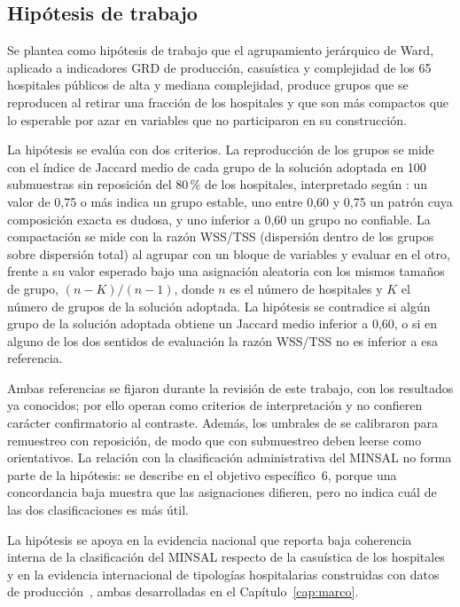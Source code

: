 \subsection{Hipótesis de trabajo}
\label{sec:hipotesis}

Se plantea como hipótesis de trabajo que el agrupamiento jerárquico de Ward,
aplicado a indicadores GRD de producción, casuística y complejidad de los 65
hospitales públicos de alta y mediana complejidad, produce grupos que se
reproducen al retirar una fracción de los hospitales y que son más compactos
que lo esperable por azar en variables que no participaron en su construcción.

La hipótesis se evalúa con dos criterios. La reproducción de los grupos se mide
con el índice de Jaccard medio de cada grupo de la solución adoptada en 100
submuestras sin reposición del 80\,\% de los hospitales, interpretado según
\citet{Hennig2007}: un valor de 0,75 o más indica un grupo estable, uno entre
0,60 y 0,75 un patrón cuya composición exacta es dudosa, y uno inferior a 0,60
un grupo no confiable. La compactación se mide con la razón WSS/TSS (dispersión
dentro de los grupos sobre dispersión total) al agrupar con un bloque de
variables y evaluar en el otro, frente a su valor esperado bajo una asignación
aleatoria con los mismos tamaños de grupo, $(n-K)/(n-1)$, donde $n$ es el
número de hospitales y $K$ el número de grupos de la solución adoptada. La
hipótesis se contradice si algún grupo de la solución adoptada obtiene un
Jaccard medio inferior a 0,60, o si en alguno de los dos sentidos de evaluación
la razón WSS/TSS no es inferior a esa referencia.

Ambas referencias se fijaron durante la revisión de este trabajo, con los
resultados ya conocidos; por ello operan como criterios de interpretación y no
confieren carácter confirmatorio al contraste. Además, los umbrales de
\citet{Hennig2007} se calibraron para remuestreo con reposición, de modo que con
submuestreo deben leerse como orientativos. La relación con la clasificación
administrativa del MINSAL no forma parte de la hipótesis: se describe en el
objetivo específico~6, porque una concordancia baja muestra que las
asignaciones difieren, pero no indica cuál de las dos clasificaciones es más
útil.

La hipótesis se apoya en la evidencia nacional que reporta baja coherencia
interna de la clasificación del MINSAL respecto de la casuística de los
hospitales~\citep{Carlier2020, Giglio2021, Villalobos2016} y en la evidencia
internacional de tipologías hospitalarias construidas con datos de
producción~\citep{Chrusciel2021, Liu2025}, ambas desarrolladas en el
Capítulo~\ref{cap:marco}.

